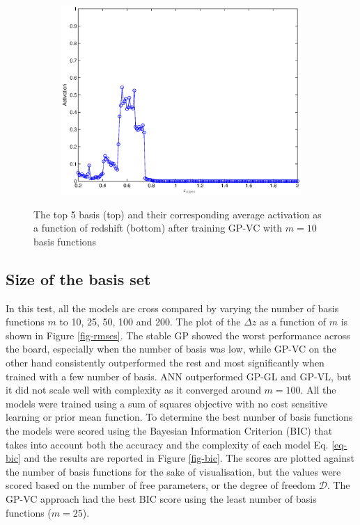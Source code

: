 \documentclass[useAMS,usenatbib,fleqn]{mn2e}
\begin{document}
\begin{figure}
\begin{subfigure}[b]{0.175\textwidth}
                \includegraphics[width=\textwidth]{figures/activation_05.eps}
        \end{subfigure}
        
       \caption{The top 5 basis (top) and their corresponding average activation as a function of redshift (bottom) after training GP-VC with $m=10$ basis functions}
	\label{fig-kernel-activations}
\end{figure}

\subsection{Size of the basis set}
In this test, all the models are cross compared by varying the number of basis functions $m$ to 10, 25, 50, 100 and 200. The plot of the $\Delta z$ as a function of $m$ is shown in Figure \ref{fig-rmses}. The stable GP showed the worst performance across the board, especially when the number of basis was low, while GP-VC on the other hand consistently outperformed the rest and most significantly when trained with a few number of basis. ANN outperformed GP-GL and GP-VL, but it did not scale well with complexity as it converged around $m=100$. All the models were trained using a sum of squares objective with no cost sensitive learning or prior mean function. To determine the best number of basis functions the models were scored using the Bayesian Information Criterion (BIC) \citep{schwarz1978}  that takes into account both the accuracy and the complexity of each model Eq. \eqref{eq-bic} and the results are reported in Figure \ref{fig-bic}. The scores are plotted against the number of basis functions for the sake of visualisation, but the values were scored based on the number of free parameters, or the degree of freedom $\mathcal{D}$. The GP-VC approach had the best BIC score using the least number of basis functions ($m=25$).
\end{document}
